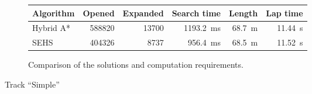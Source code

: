 \begin{figure}[!tbp]
	\vspace{0.75cm}

	\begin{subfigure}[t]{\textwidth}
		\centering
		\begin{tabular}{l r r r r r}%
			\toprule
			Algorithm & Opened & Expanded & Search time & Length & Lap time \\
			\midrule
			Hybrid A* & \num{588820} & \num{13700} & \SI{1193.2}{\milli\second} & \SI{68.7}{\meter} & \bftab \SI{11.44}{\second} \\
			SEHS & \bftab \num{404326} & \bftab \num{8737} & \bftab \SI{956.4}{\milli\second} &  \SI{68.5}{\meter} & \bftab \SI{11.52}{\second} \\
			\bottomrule
		\end{tabular}
		\caption{Comparison of the solutions and computation requirements.}
		\label{table:simple}
	\end{subfigure}
	
	\vspace{0.75cm}

	\caption{Track ``Simple''}
	\label{fig:simple}
\end{figure}

